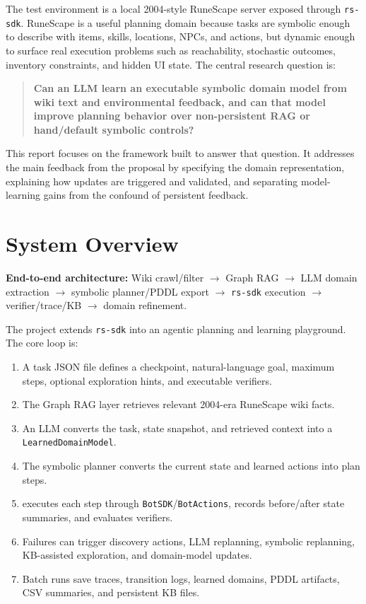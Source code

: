 \documentclass[10pt,twocolumn,letterpaper]{article}
\begin{document}
The test environment is a local 2004-style RuneScape server exposed through \texttt{rs-sdk}. RuneScape is a useful planning domain because tasks are symbolic enough to describe with items, skills, locations, NPCs, and actions, but dynamic enough to surface real execution problems such as reachability, stochastic outcomes, inventory constraints, and hidden UI state. The central research question is:

\begin{quote}
\textbf{Can an LLM learn an executable symbolic domain model from wiki text and environmental feedback, and can that model improve planning behavior over non-persistent RAG or hand/default symbolic controls?}
\end{quote}

This report focuses on the framework built to answer that question. It addresses the main feedback from the proposal by specifying the domain representation, explaining how updates are triggered and validated, and separating model-learning gains from the confound of persistent feedback.

\section{System Overview}

\noindent\textbf{End-to-end architecture:}
Wiki crawl/filter $\rightarrow$ Graph RAG $\rightarrow$ LLM domain extraction $\rightarrow$ symbolic planner/PDDL export $\rightarrow$ \texttt{rs-sdk} execution $\rightarrow$ verifier/trace/KB $\rightarrow$ domain refinement.

The project extends \texttt{rs-sdk} into an agentic planning and learning playground. The core loop is:

\begin{enumerate}
    \item A task JSON file defines a checkpoint, natural-language goal, maximum steps, optional exploration hints, and executable verifiers.
    \item The Graph RAG layer retrieves relevant 2004-era RuneScape wiki facts.
    \item An LLM converts the task, state snapshot, and retrieved context into a \texttt{LearnedDomainModel}.
    \item The symbolic planner converts the current state and learned actions into plan steps.
    \item {} executes each step through \texttt{BotSDK}/\texttt{BotActions}, records before/after state summaries, and evaluates verifiers.
    \item Failures can trigger discovery actions, LLM replanning, symbolic replanning, KB-assisted exploration, and domain-model updates.
    \item Batch runs save traces, transition logs, learned domains, PDDL artifacts, CSV summaries, and persistent KB files.
\end{enumerate}
\end{document}
